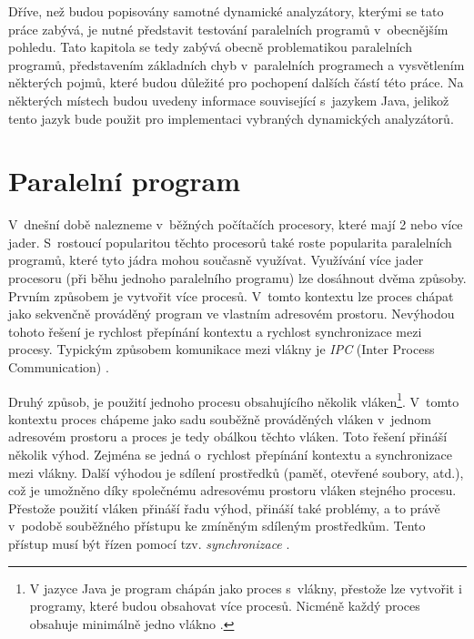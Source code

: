Dříve, než budou popisovány samotné dynamické analyzátory, kterými se tato práce zabývá, je nutné představit testování paralelních programů v~obecnějším pohledu. Tato kapitola se tedy zabývá obecně problematikou paralelních programů, představením základních chyb v~paralelních programech a vysvětlením některých pojmů, které budou důležité pro pochopení dalších částí této práce. Na některých místech budou uvedeny informace související s~jazykem Java, jelikož tento jazyk bude použit pro implementaci vybraných dynamických analyzátorů.

\section{Paralelní program}\label{paralel-program}
V~dnešní době nalezneme v~běžných počítačích procesory, které mají 2 nebo více jader. S~rostoucí popularitou těchto procesorů také roste popularita paralelních programů, které tyto jádra mohou současně využívat. Využívání více jader procesoru (při běhu jednoho paralelního programu) lze dosáhnout dvěma způsoby. Prvním způsobem je vytvořit více procesů. V~tomto kontextu lze proces chápat jako sekvenčně prováděný program ve vlastním adresovém prostoru. Nevýhodou tohoto řešení je rychlost přepínání kontextu a rychlost synchronizace mezi procesy. Typickým způsobem komunikace mezi vlákny je \textit{IPC} (Inter Process Communication) \cite{cite:IPC, cite:paralel-programming}.

Druhý způsob, je použití jednoho procesu obsahujícího několik vláken\footnote{V jazyce Java je program chápán jako proces s~vlákny, přestože lze vytvořit i programy, které budou obsahovat více procesů. Nicméně každý proces obsahuje minimálně jedno vlákno \cite{cite:java}.}. V~tomto kontextu proces chápeme jako sadu souběžně prováděných vláken v~jednom adresovém prostoru a proces je tedy obálkou těchto vláken. Toto řešení přináší několik výhod. Zejména se jedná o~rychlost přepínání kontextu a synchronizace mezi vlákny. Další výhodou je sdílení prostředků (paměť, otevřené soubory, atd.), což je umožněno díky společnému adresovému prostoru vláken stejného procesu. Přestože použití vláken přináší řadu výhod, přináší také problémy, a to právě v~podobě souběžného přístupu ke zmíněným sdíleným prostředkům. Tento přístup musí být řízen pomocí tzv. \textit{synchronizace} \cite{cite:paralel-programming}.

